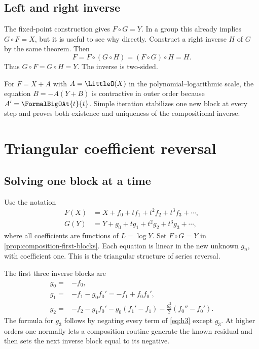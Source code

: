 \documentclass[11pt,oneside]{book}
\theoremstyle{definition}
\theoremstyle{remark}
\newcommand{\compose}{\mathbin{\circ}}
\begin{document}
\section{Left and right inverse}
The fixed-point construction gives $F\compose G=Y$.  In a group this already
implies $G\compose F=X$, but it is useful to see why directly.  Construct a
right inverse $H$ of $G$ by the same theorem.  Then
\[
 F=F\compose(G\compose H)=(F\compose G)\compose H=H.
\]
Thus $G\compose F=G\compose H=Y$.  The inverse is two-sided.

\begin{summarybox}
For $F=X+A$ with $A=\LittleO(X)$ in the polynomial--logarithmic scale, the equation
$B=-A(Y+B)$ is contractive in outer order because $A'=\FormalBigOAt{t}{t}$.  Simple
iteration stabilizes one new block at every step and proves both existence and
uniqueness of the compositional inverse.
\end{summarybox}


\chapter{Triangular coefficient reversal}
\label{ch:reversion-triangular}

\section{Solving one block at a time}
Use the notation
\begin{align*}
 F(X)&=X+f_0+t f_1+t^2f_2+t^3f_3+\cdots,\\
 G(Y)&=Y+g_0+t g_1+t^2g_2+t^3g_3+\cdots,
\end{align*}
where all coefficients are functions of $L=\log Y$.  Set $F\compose G=Y$ in
\cref{prop:composition-first-blocks}.  Each equation is linear in the new
unknown $g_n$, with coefficient one.  This is the triangular structure of
series reversal.

The first three inverse blocks are
\begin{align}
 g_0={}&-f_0,\label{eq:inverse-g0}\\
 g_1={}&-f_1-g_0f_0'= -f_1+f_0f_0',\label{eq:inverse-g1}\\
 g_2={}&-f_2-g_1f_0'-g_0(f_1'-f_1)
 -\frac{g_0^2}{2}(f_0''-f_0').
 \label{eq:inverse-g2}
\end{align}
The formula for $g_3$ follows by negating every term of \eqref{eq:h3} except
$g_3$.  At higher orders one normally lets a composition routine generate the
known residual and then sets the next inverse block equal to its negative.
\end{document}
